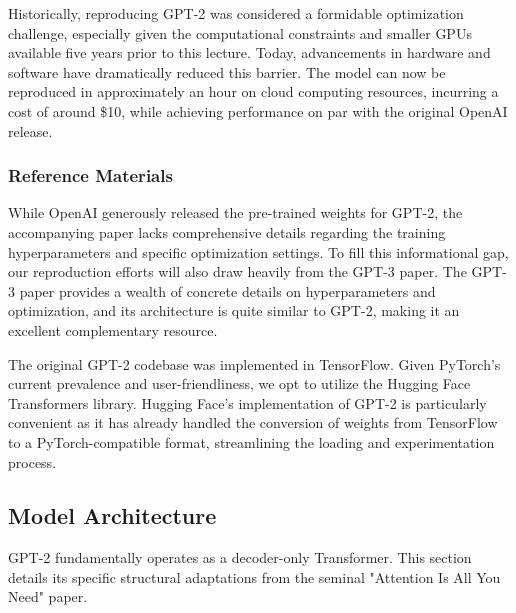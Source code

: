 Historically, reproducing GPT-2 was considered a formidable optimization challenge, especially given the computational constraints and smaller GPUs available five years prior to this lecture. Today, advancements in hardware and software have dramatically reduced this barrier. The model can now be reproduced in approximately an hour on cloud computing resources, incurring a cost of around \$10, while achieving performance on par with the original OpenAI release.

\subsubsection{Reference Materials}
While OpenAI generously released the pre-trained weights for GPT-2, the accompanying paper lacks comprehensive details regarding the training hyperparameters and specific optimization settings. To fill this informational gap, our reproduction efforts will also draw heavily from the GPT-3 paper. The GPT-3 paper provides a wealth of concrete details on hyperparameters and optimization, and its architecture is quite similar to GPT-2, making it an excellent complementary resource.

The original GPT-2 codebase was implemented in TensorFlow. Given PyTorch's current prevalence and user-friendliness, we opt to utilize the Hugging Face Transformers library. Hugging Face's implementation of GPT-2 is particularly convenient as it has already handled the conversion of weights from TensorFlow to a PyTorch-compatible format, streamlining the loading and experimentation process.

\subsection{Model Architecture}
GPT-2 fundamentally operates as a decoder-only Transformer. This section details its specific structural adaptations from the seminal "Attention Is All You Need" paper.

